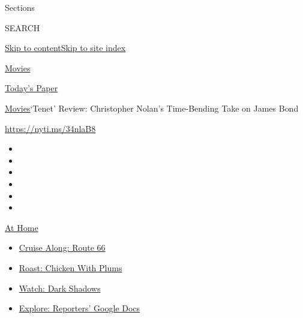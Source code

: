 Sections

SEARCH

\protect\hyperlink{site-content}{Skip to
content}\protect\hyperlink{site-index}{Skip to site index}

\href{https://www.nytimes3xbfgragh.onion/section/movies}{Movies}

\href{https://myaccount.nytimes3xbfgragh.onion/auth/login?response_type=cookie\&client_id=vi}{}

\href{https://www.nytimes3xbfgragh.onion/section/todayspaper}{Today's
Paper}

\href{/section/movies}{Movies}\textbar{}`Tenet' Review: Christopher
Nolan's Time-Bending Take on James Bond

\url{https://nyti.ms/34nlaB8}

\begin{itemize}
\item
\item
\item
\item
\item
\item
\end{itemize}

\href{https://www.nytimes3xbfgragh.onion/spotlight/at-home?action=click\&pgtype=Article\&state=default\&region=TOP_BANNER\&context=at_home_menu}{At
Home}

\begin{itemize}
\tightlist
\item
  \href{https://www.nytimes3xbfgragh.onion/2020/09/07/travel/route-66.html?action=click\&pgtype=Article\&state=default\&region=TOP_BANNER\&context=at_home_menu}{Cruise
  Along: Route 66}
\item
  \href{https://www.nytimes3xbfgragh.onion/2020/09/04/dining/sheet-pan-chicken.html?action=click\&pgtype=Article\&state=default\&region=TOP_BANNER\&context=at_home_menu}{Roast:
  Chicken With Plums}
\item
  \href{https://www.nytimes3xbfgragh.onion/2020/09/04/arts/television/dark-shadows-stream.html?action=click\&pgtype=Article\&state=default\&region=TOP_BANNER\&context=at_home_menu}{Watch:
  Dark Shadows}
\item
  \href{https://www.nytimes3xbfgragh.onion/interactive/2020/at-home/even-more-reporters-editors-diaries-lists-recommendations.html?action=click\&pgtype=Article\&state=default\&region=TOP_BANNER\&context=at_home_menu}{Explore:
  Reporters' Google Docs}
\end{itemize}

